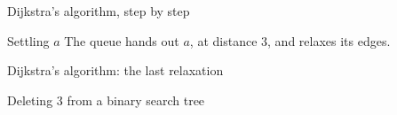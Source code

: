 \documentclass{beamer}
\begin{document}
\begin{frame}{Dijkstra's algorithm, step by step}
  \centering
\end{frame}

\begin{frame}{Settling $a$}
  The queue hands out $a$, at distance $3$, and relaxes its edges.
  \pause

  \centering
\end{frame}

\begin{frame}[fragile]{Dijkstra's algorithm: the last relaxation}
  \centering
\end{frame}

\begin{frame}{Deleting $3$ from a binary search tree}
  \centering
\end{frame}
\end{document}
